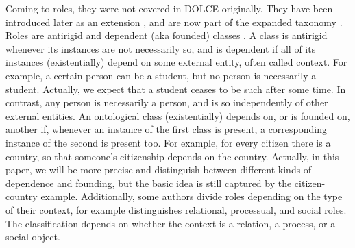 \documentclass[sw]{iosart2x}
\newcommand{\DOLCE}{\textsc{DOLCE}\xspace} %
\begin{document}
Coming to roles, they were not covered in \DOLCE originally. They have been introduced later as an extension \cite{masoloSocialRolesTheir2004}, and are now part of the expanded taxonomy \cite{borgoDOLCEDescriptiveOntology2022}.
Roles are antirigid and dependent (aka founded) classes \cite{guarinoOverviewOntoClean2009, guarinoFormalOntologyProperties2000,masoloSocialRolesTheir2004}. 
A class is antirigid whenever its instances are not necessarily so, and is dependent if all of its instances (existentially) depend on some external entity, often called context.
For example, a certain person can be a student, but no person is necessarily a student. Actually, we expect that a student ceases to be such after some time. 
In contrast, any person is necessarily a person, and is so independently of other external entities.
An ontological class (existentially) depends on, or is founded on, another if, whenever an instance of the first class is present, a corresponding instance of the second is present too.
For example, for every citizen there is a country, so that someone's citizenship depends on the country. Actually, in this paper, we will be more precise and distinguish between different kinds of dependence and founding, but the basic idea is still captured by the citizen-country example. 
Additionally, some authors divide roles depending on the type of their context, 
for example \cite{loebeAbstractVsSocial2007} distinguishes relational, processual, and social roles. The classification depends on whether the context is a relation, a process, or a social object. 
\end{document}
